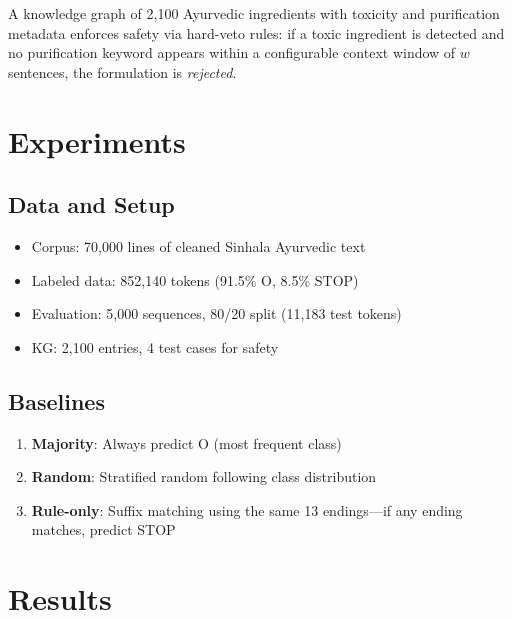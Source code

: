 \documentclass[11pt,a4paper]{article}
\begin{document}
A knowledge graph of 2,100 Ayurvedic ingredients with toxicity and purification metadata enforces safety via hard-veto rules: if a toxic ingredient is detected and no purification keyword appears within a configurable context window of $w$ sentences, the formulation is \textit{rejected}.

\section{Experiments}

\subsection{Data and Setup}

\begin{itemize}[nosep]
    \item Corpus: 70,000 lines of cleaned Sinhala Ayurvedic text
    \item Labeled data: 852,140 tokens (91.5\% O, 8.5\% STOP)
    \item Evaluation: 5,000 sequences, 80/20 split (11,183 test tokens)
    \item KG: 2,100 entries, 4 test cases for safety
\end{itemize}

\subsection{Baselines}

\begin{enumerate}[nosep]
    \item \textbf{Majority}: Always predict O (most frequent class)
    \item \textbf{Random}: Stratified random following class distribution
    \item \textbf{Rule-only}: Suffix matching using the same 13 endings—if any ending matches, predict STOP
\end{enumerate}

\section{Results}
\end{document}
